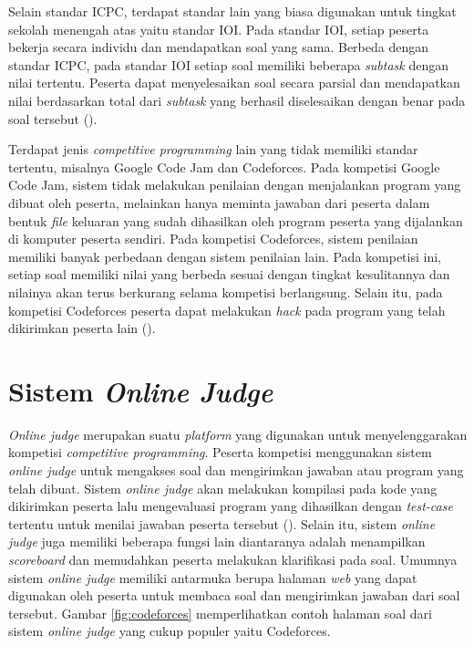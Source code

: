 \par Selain standar ICPC, terdapat standar lain yang biasa digunakan untuk tingkat sekolah menengah atas yaitu standar IOI. Pada standar IOI, setiap peserta bekerja secara individu dan mendapatkan soal yang sama. Berbeda dengan standar ICPC, pada standar IOI setiap soal memiliki beberapa \textit{subtask} dengan nilai tertentu. Peserta dapat menyelesaikan soal secara parsial dan mendapatkan nilai berdasarkan total dari \textit{subtask} yang berhasil diselesaikan dengan benar pada soal tersebut (\cite{ioi2017}).
\par Terdapat jenis \textit{competitive programming} lain yang tidak memiliki standar tertentu, misalnya Google Code Jam dan Codeforces. Pada kompetisi Google Code Jam, sistem tidak melakukan penilaian dengan menjalankan program yang dibuat oleh peserta, melainkan hanya meminta jawaban dari peserta dalam bentuk \textit{file} keluaran yang sudah dihasilkan oleh program peserta yang dijalankan di komputer peserta sendiri. Pada kompetisi Codeforces, sistem penilaian memiliki banyak perbedaan dengan sistem penilaian lain. Pada kompetisi ini, setiap soal memiliki nilai yang berbeda sesuai dengan tingkat kesulitannya dan nilainya akan terus berkurang selama kompetisi berlangsung. Selain itu, pada kompetisi Codeforces peserta dapat melakukan \textit{hack} pada program yang telah dikirimkan peserta lain (\cite{cfrules}).

\section{Sistem \textit{Online Judge}}

\par \textit{Online judge} merupakan suatu \textit{platform} yang digunakan untuk menyelenggarakan kompetisi \textit{competitive programming}. Peserta kompetisi menggunakan sistem \textit{online judge} untuk mengakses soal dan mengirimkan jawaban atau program yang telah dibuat. Sistem \textit{online judge} akan melakukan kompilasi pada kode yang dikirimkan peserta lalu mengevaluasi program yang dihasilkan dengan \textit{test-case} tertentu untuk menilai jawaban peserta tersebut (\cite{wasikojsurvey}). Selain itu, sistem \textit{online judge} juga memiliki beberapa fungsi lain diantaranya adalah menampilkan \textit{scoreboard} dan memudahkan peserta melakukan klarifikasi pada soal. Umumnya sistem \textit{online judge} memiliki antarmuka berupa halaman \textit{web} yang dapat digunakan oleh peserta untuk membaca soal dan mengirimkan jawaban dari soal tersebut. Gambar \ref{fig:codeforces} memperlihatkan contoh halaman soal dari sistem \textit{online judge} yang cukup populer yaitu Codeforces.

